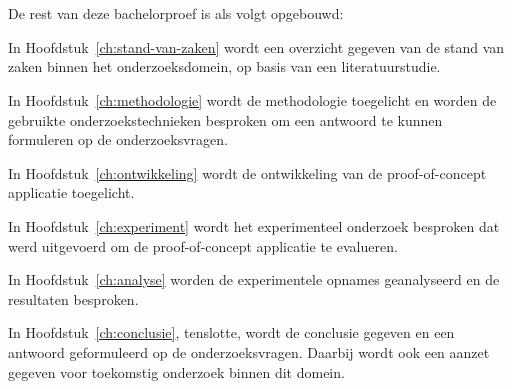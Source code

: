 \section{}%
\label{sec:opzet-bachelorproef}


De rest van deze bachelorproef is als volgt opgebouwd:

In Hoofdstuk~\ref{ch:stand-van-zaken} wordt een overzicht gegeven van de stand van zaken binnen het onderzoeksdomein, op basis van een literatuurstudie.

In Hoofdstuk~\ref{ch:methodologie} wordt de methodologie toegelicht en worden de gebruikte onderzoekstechnieken besproken om een antwoord te kunnen formuleren op de onderzoeksvragen.

In Hoofdstuk~\ref{ch:ontwikkeling} wordt de ontwikkeling van de proof-of-concept applicatie toegelicht.

In Hoofdstuk~\ref{ch:experiment} wordt het experimenteel onderzoek besproken dat werd uitgevoerd om de proof-of-concept applicatie te evalueren.

In Hoofdstuk~\ref{ch:analyse} worden de experimentele opnames geanalyseerd en de resultaten besproken.

In Hoofdstuk~\ref{ch:conclusie}, tenslotte, wordt de conclusie gegeven en een antwoord geformuleerd op de onderzoeksvragen. Daarbij wordt ook een aanzet gegeven voor toekomstig onderzoek binnen dit domein.